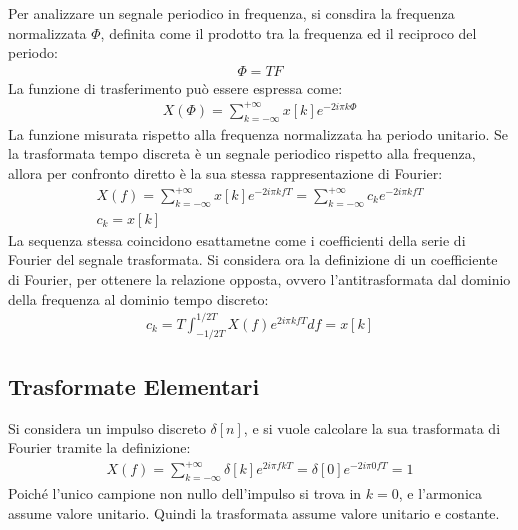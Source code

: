 \documentclass{article}
\numberwithin{equation}{subsection}
\begin{document}
Per analizzare un segnale periodico in frequenza, si consdira la frequenza normalizzata $\Phi$, definita come il prodotto tra la frequenza ed il reciproco del periodo:
\begin{gather*}
    \Phi=TF
\end{gather*}
La funzione di trasferimento può essere espressa come:
\begin{gather*}
    X(\Phi)=\displaystyle\sum_{k=-\infty}^{+\infty}x[k]e^{-2i\pi k\Phi}
\end{gather*}
La funzione misurata rispetto alla frequenza normalizzata ha periodo unitario. 
Se la trasformata tempo discreta è un segnale periodico rispetto alla frequenza, allora per confronto diretto è la sua stessa rappresentazione di Fourier:
\begin{gather*}
    X(f)=\displaystyle\sum_{k=-\infty}^{+\infty}x[k]e^{-2i\pi kfT}=\sum_{k=-\infty}^{+\infty}c_ke^{-2i\pi kfT}\\
    c_k=x[k]
\end{gather*}
La sequenza stessa coincidono esattametne come i coefficienti della serie di Fourier del segnale trasformata. Si considera ora la definizione di un coefficiente di Fourier, 
per ottenere la relazione opposta, ovvero l'antitrasformata dal dominio della frequenza al dominio tempo discreto:
\begin{gather*}
    c_k=\displaystyle T\int_{-1/2T}^{1/2T}X(f)e^{2i\pi kfT}df=x[k]
\end{gather*}

\subsection{Trasformate Elementari}

Si considera un impulso discreto $\delta[n]$, e si vuole calcolare la sua trasformata di Fourier tramite la definizione:
\begin{gather*}
    X(f)=\displaystyle\sum_{k=-\infty}^{+\infty}\delta[k]e^{2i\pi fkT}=\delta[0]e^{-2i\pi 0fT}=1
\end{gather*}
Poiché l'unico campione non nullo dell'impulso si trova in $k=0$, e l'armonica assume valore unitario. Quindi la trasformata assume valore unitario e costante. 
\end{document}
